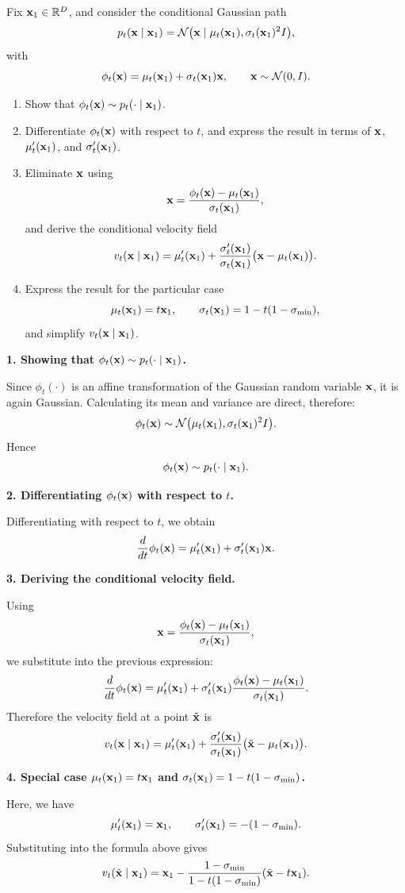 \begin{exercise}
Fix \({ \mathbf{x}}_1\in\mathbb{R}^D\), and consider the conditional Gaussian path
\[
p_t({ \mathbf{x}}\mid { \mathbf{x}}_1)=\mathcal N\bigl({ \mathbf{x}} \mid \mu_t({ \mathbf{x}}_1),\sigma_t({ \mathbf{x}}_1)^2 I\bigr),
\]
with
\[
\phi_t({ \mathbf{x}})=\mu_t({ \mathbf{x}}_1)+\sigma_t({ \mathbf{x}}_1){ \mathbf{x}},
\qquad { \mathbf{x}}\sim \mathcal N(0,I).
\]

\begin{enumerate}
\item Show that \(\phi_t({ \mathbf{x}})\sim p_t(\cdot\mid { \mathbf{x}}_1)\).
\item Differentiate \(\phi_t({ \mathbf{x}})\) with respect to \(t\), and express the result in terms of \({ \mathbf{x}}\), \(\mu_t'({ \mathbf{x}}_1)\), and \(\sigma_t'({ \mathbf{x}}_1)\).
\item Eliminate \({ \mathbf{x}}\) using
\[
{ \mathbf{x}}=\frac{\phi_t({ \mathbf{x}})-\mu_t({ \mathbf{x}}_1)}{\sigma_t({ \mathbf{x}}_1)},
\]
and derive the conditional velocity field
\[
v_t({ \mathbf{x}}\mid { \mathbf{x}}_1)
=
\mu_t'({ \mathbf{x}}_1)
+
\frac{\sigma_t'({ \mathbf{x}}_1)}{\sigma_t({ \mathbf{x}}_1)}
\bigl({ \mathbf{x}}-\mu_t({ \mathbf{x}}_1)\bigr).
\]
\item Express the result for the particular case 
\[
\mu_t({ \mathbf{x}}_1)=t{ \mathbf{x}}_1,
\qquad
\sigma_t({ \mathbf{x}}_1)=1-t(1-\sigma_{\min}),
\]
and simplify \(v_t({ \mathbf{x}}\mid { \mathbf{x}}_1)\).
\end{enumerate}
\end{exercise}

\begin{solution}

\textbf{1. Showing that \(\phi_t({ \mathbf{x}})\sim p_t(\cdot\mid { \mathbf{x}}_1)\).}

Since $\phi_t(\cdot)$ is an affine transformation of the Gaussian random variable  ${ \mathbf{x}}$, it is again Gaussian. Calculating its mean and variance are direct, therefore:  
\[
\phi_t({ \mathbf{x}})\sim \mathcal N\bigl(\mu_t({ \mathbf{x}}_1),\sigma_t({ \mathbf{x}}_1)^2 I\bigr).
\]
Hence
\[
\phi_t({ \mathbf{x}})\sim p_t(\cdot\mid { \mathbf{x}}_1).
\]

\bigskip

\textbf{2. Differentiating \(\phi_t({ \mathbf{x}})\) with respect to \(t\).}

Differentiating with respect to \(t\), we obtain
\[
\frac{d}{dt}\phi_t({ \mathbf{x}})
=
\mu_t'({ \mathbf{x}}_1)+\sigma_t'({ \mathbf{x}}_1){ \mathbf{x}}.
\]

\bigskip

\textbf{3. Deriving the conditional velocity field.}

Using
\[
{ \mathbf{x}}=\frac{\phi_t({ \mathbf{x}})-\mu_t({ \mathbf{x}}_1)}{\sigma_t({ \mathbf{x}}_1)},
\]
we substitute into the previous expression:
\[
\frac{d}{dt}\phi_t({ \mathbf{x}})
=
\mu_t'({ \mathbf{x}}_1)
+
\sigma_t'({ \mathbf{x}}_1)\frac{\phi_t({ \mathbf{x}})-\mu_t({ \mathbf{x}}_1)}{\sigma_t({ \mathbf{x}}_1)}.
\]
Therefore the velocity field at a point \(\tilde{{ \mathbf{x}}}\) is
\[
v_t({ \mathbf{x}}\mid { \mathbf{x}}_1)
=
\mu_t'({ \mathbf{x}}_1)
+
\frac{\sigma_t'({ \mathbf{x}}_1)}{\sigma_t({ \mathbf{x}}_1)}
\bigl(\tilde{{ \mathbf{x}}}-\mu_t({ \mathbf{x}}_1)\bigr).
\]

\bigskip

\textbf{4. Special case \(\mu_t({ \mathbf{x}}_1)=t{ \mathbf{x}}_1\) and \(\sigma_t({ \mathbf{x}}_1)=1-t(1-\sigma_{\min})\).}

Here, we have
\[
\mu_t'({ \mathbf{x}}_1)={ \mathbf{x}}_1,
\qquad
\sigma_t'({ \mathbf{x}}_1)=-(1-\sigma_{\min}).
\]
Substituting into the formula above gives
\[
v_t(\tilde{{ \mathbf{x}}}\mid { \mathbf{x}}_1)
=
{ \mathbf{x}}_1
-
\frac{1-\sigma_{\min}}{1-t(1-\sigma_{\min})}
(\tilde{{ \mathbf{x}}}-t{ \mathbf{x}}_1).
\]

\end{solution}

